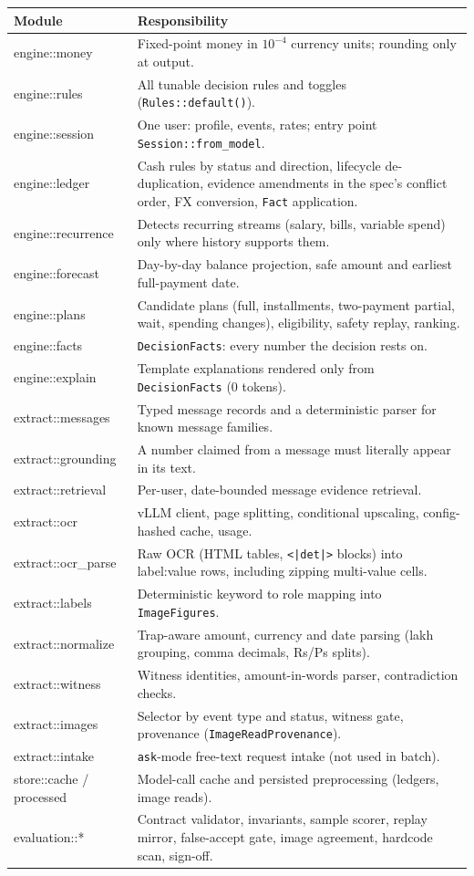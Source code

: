 \documentclass[11pt,a4paper]{article}
\begin{document}
\begin{longtable}{>{\ttfamily}p{3.6cm} p{11.6cm}}
\toprule
\normalfont\textbf{Module} & \textbf{Responsibility}\\\midrule
\endhead
engine::money & Fixed-point money in $10^{-4}$ currency units; rounding only at output.\\
engine::rules & All tunable decision rules and toggles (\texttt{Rules::default()}).\\
engine::session & One user: profile, events, rates; entry point \texttt{Session::from\_model}.\\
engine::ledger & Cash rules by status and direction, lifecycle de-duplication, evidence amendments in the spec's conflict order, FX conversion, \texttt{Fact} application.\\
engine::recurrence & Detects recurring streams (salary, bills, variable spend) only where history supports them.\\
engine::forecast & Day-by-day balance projection, safe amount and earliest full-payment date.\\
engine::plans & Candidate plans (full, installments, two-payment partial, wait, spending changes), eligibility, safety replay, ranking.\\
engine::facts & \texttt{DecisionFacts}: every number the decision rests on.\\
engine::explain & Template explanations rendered only from \texttt{DecisionFacts} (0 tokens).\\
extract::messages & Typed message records and a deterministic parser for known message families.\\
extract::grounding & A number claimed from a message must literally appear in its text.\\
extract::retrieval & Per-user, date-bounded message evidence retrieval.\\
extract::ocr & vLLM client, page splitting, conditional upscaling, config-hashed cache, usage.\\
extract::ocr\_parse & Raw OCR (HTML tables, \texttt{<|det|>} blocks) into label:value rows, including zipping multi-value cells.\\
extract::labels & Deterministic keyword to role mapping into \texttt{ImageFigures}.\\
extract::normalize & Trap-aware amount, currency and date parsing (lakh grouping, comma decimals, Rs/Ps splits).\\
extract::witness & Witness identities, amount-in-words parser, contradiction checks.\\
extract::images & Selector by event type and status, witness gate, provenance (\texttt{ImageReadProvenance}).\\
extract::intake & \texttt{ask}-mode free-text request intake (not used in batch).\\
store::cache / processed & Model-call cache and persisted preprocessing (ledgers, image reads).\\
evaluation::* & Contract validator, invariants, sample scorer, replay mirror, false-accept gate, image agreement, hardcode scan, sign-off.\\
\bottomrule
\end{longtable}
\end{document}
